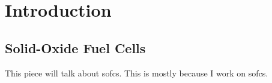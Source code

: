 


\chapter{Introduction}

\section{Solid-Oxide Fuel Cells}

This piece will talk about \glspl{sofc}. This is mostly because I work on \glspl{sofc}.
\lipsum\cite{Wang2006a}
